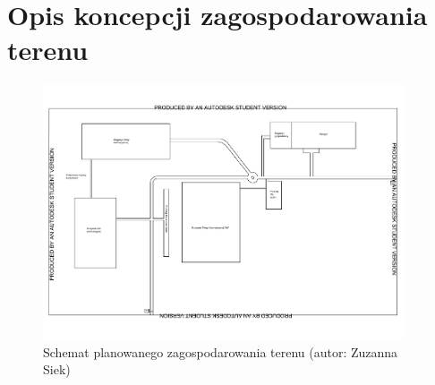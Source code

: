 \section{Opis koncepcji zagospodarowania terenu}

\begin{figure}[h]
	\centering
	\includegraphics[width=0.95\textwidth]{./sec18/zagospodarowanie_terenu.pdf}
	\caption{Schemat planowanego zagospodarowania terenu (autor: Zuzanna Siek)}
\end{figure}
